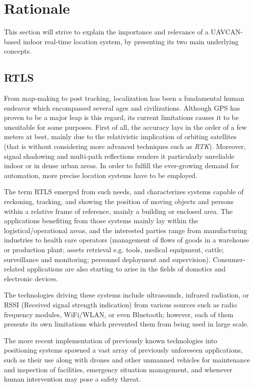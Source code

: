 \section{Rationale}
This section will strive to explain the importance and relevance of a UAVCAN-based indoor real-time location system, by presenting its two main underlying concepts.

\subsection{RTLS}

From map-making to post tracking, localization has been a fundamental human endeavor which encompassed several ages and civilizations.
Although GPS has proven to be a major leap is this regard, its current limitations causes it to be unsuitable for some purposes.
First of all, the accuracy lays in the order of a few meters at best, mainly due to the relativistic implication of orbiting satellites \cite{gps} (that is without considering more advanced techniques such as \emph{RTK}).
Moreover, signal shadowing and multi-path reflections renders it particularly unreliable indoor or in dense urban areas.
In order to fulfill the ever-growing demand for automation, more precise location systems have to be employed.

The term RTLS emerged from such needs, and characterizes systems capable of reckoning, tracking, and showing the position of moving objects and persons within a relative frame of reference, mainly a building or enclosed area.
The applications benefiting from those systems mainly lay within the logistical/operational areas, and the interested parties range from manufacturing industries to health care operators (management of flows of goods in a warehouse or production plant; assets retrieval e.g. tools, medical equipment, cattle; surveillance and monitoring; personnel deployment and supervision).
Consumer-related applications are also starting to arise in the fields of domotics and electronic devices.

The technologies driving these systems include ultrasounds, infrared radiation, or RSSI (Received signal strength indication) from various sources such as radio frequency modules, WiFi/WLAN, or even Bluetooth; however, each of them presents its own limitations which prevented them from being used in large scale. \cite{joost}

The more recent implementation of previously known technologies into positioning systems spawned a vast array of previously unforeseen applications, such as their use along with drones and other unmanned vehicles for maintenance and inspection of facilities, emergency situation management, and whenever human intervention may pose a safety threat.


